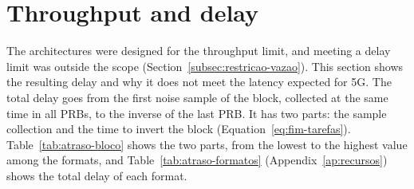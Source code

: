 \section{\texorpdfstring{Throughput and delay}{Throughput and delay}}\label{sec:resultados-atraso}

The architectures were designed for the throughput limit, and meeting a delay limit was outside the scope (Section~\ref{subsec:restricao-vazao}). This section shows the resulting delay and why it does not meet the latency expected for 5G. The total delay goes from the first noise sample of the block, collected at the same time in all PRBs, to the inverse of the last PRB. It has two parts: the sample collection and the time to invert the block (Equation~\ref{eq:fim-tarefas}). Table~\ref{tab:atraso-bloco} shows the two parts, from the lowest to the highest value among the formats, and Table~\ref{tab:atraso-formatos} (Appendix~\ref{ap:recursos}) shows the total delay of each format.

